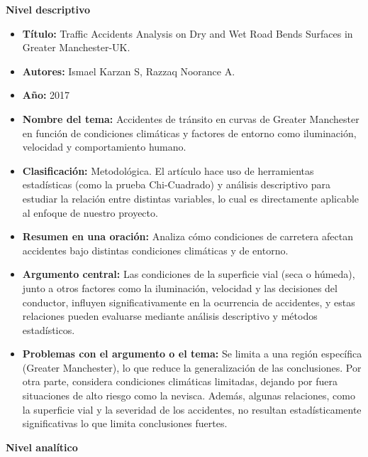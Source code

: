 \documentclass[12pt]{article}
\begin{document}
\textbf{Nivel descriptivo}
\begin{itemize}
    \item \textbf{Título:} Traffic Accidents Analysis on Dry and Wet Road Bends Surfaces in Greater Manchester-UK. 
    
    \item \textbf{Autores:} Ismael Karzan S, Razzaq Noorance A. 
    
    \item \textbf{Año:} 2017 
    
    \item \textbf{Nombre del tema:} Accidentes de tránsito en curvas de Greater Manchester en función de condiciones climáticas y factores de entorno como iluminación, velocidad y comportamiento humano. 
    
    \item \textbf{Clasificación:} Metodológica. El artículo hace uso de herramientas estadísticas (como la prueba Chi-Cuadrado) y análisis descriptivo para estudiar la relación entre distintas variables, lo cual es directamente aplicable al enfoque de nuestro proyecto.
    
    \item \textbf{Resumen en una oración:} Analiza cómo condiciones de carretera afectan accidentes bajo distintas condiciones climáticas y de entorno. 
    
    \item \textbf{Argumento central:} Las condiciones de la superficie vial (seca o húmeda), junto a otros factores como la iluminación, velocidad y las decisiones del conductor, influyen significativamente en la ocurrencia de accidentes, y estas relaciones pueden evaluarse mediante análisis descriptivo y métodos estadísticos. 
    
    \item \textbf{Problemas con el argumento o el tema:} Se limita a una región específica (Greater Manchester), lo que reduce la generalización de las conclusiones. Por otra parte, considera condiciones climáticas limitadas, dejando por fuera situaciones de alto riesgo como la nevisca. Además, algunas relaciones, como la superficie vial y la severidad de los accidentes, no resultan estadísticamente significativas lo que limita conclusiones fuertes.  \\
\end{itemize}

\textbf{Nivel analítico}
\end{document}
